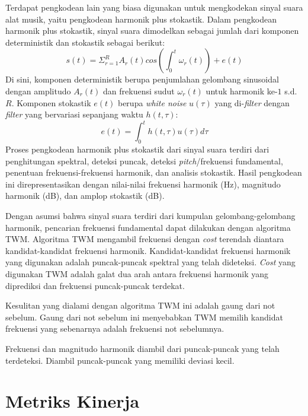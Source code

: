 Terdapat pengkodean lain yang biasa digunakan untuk mengkodekan sinyal suara alat musik, yaitu pengkodean harmonik plus stokastik. Dalam pengkodean harmonik plus stokastik, sinyal suara dimodelkan sebagai jumlah dari komponen deterministik dan stokastik sebagai berikut:\parencite{serra1997sineplusnoise}
\begin{equation}
s(t)=\Sigma_{r=1}^{R} A_r(t) cos (\int_0^t\omega_r(t))+e(t)
\end{equation}
Di sini, komponen deterministik berupa penjumlahan gelombang sinusoidal dengan amplitudo $A_r(t)$ dan frekuensi sudut $\omega_r(t)$ untuk harmonik ke-$1$ s.d. $R$. Komponen stokastik $e(t)$ berupa \textit{white noise} $u(\tau)$ yang di-\textit{filter} dengan \textit{filter} yang bervariasi sepanjang waktu $h(t,\tau)$: \parencite{serra1997sineplusnoise}
\begin{equation}
e(t)=\int_0^t h(t,\tau)u(\tau)d\tau
\end{equation}
Proses pengkodean harmonik plus stokastik dari sinyal suara terdiri dari penghitungan spektral, deteksi puncak, deteksi \textit{pitch}/frekuensi fundamental, penentuan frekuensi-frekuensi harmonik, dan analisis stokastik. Hasil pengkodean ini direpresentasikan dengan nilai-nilai frekuensi harmonik (Hz), magnitudo harmonik (dB), dan amplop stokastik (dB). \parencite{serra1997sineplusnoise}

Dengan asumsi bahwa sinyal suara terdiri dari kumpulan gelombang-gelombang harmonik, pencarian frekuensi fundamental dapat dilakukan dengan algoritma TWM. Algoritma TWM mengambil frekuensi dengan \textit{cost} terendah diantara kandidat-kandidat frekuensi harmonik. Kandidat-kandidat frekuensi harmonik yang digunakan adalah puncak-puncak spektral yang telah dideteksi. \textit{Cost} yang digunakan TWM adalah galat dua arah antara frekuensi harmonik yang diprediksi dan frekuensi puncak-puncak terdekat. \parencite{beauchamp1994twm}

Kesulitan yang dialami dengan algoritma TWM ini adalah gaung dari not sebelum. Gaung dari not sebelum ini menyebabkan TWM memilih kandidat frekuensi yang sebenarnya adalah frekuensi not sebelumnya. \parencite{beauchamp1994twm}

Frekuensi dan magnitudo harmonik diambil dari puncak-puncak yang telah terdeteksi. Diambil puncak-puncak yang memiliki deviasi kecil. \parencite{sierra1990sms}

\section{Metriks Kinerja}

